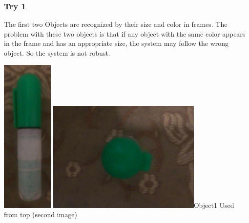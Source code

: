 \documentclass{report}
\begin{document}
\subsubsection{Try 1}
The first two Objects are recognized by their size and color in frames. The problem with these two objects is that if any object with the same color appears in the frame and has an appropriate size, the system may follow the wrong object. So the system is not robust. \newline
\begin{center}
\includegraphics[width=1in]{Object1.jpg}
\includegraphics[width=3in]{Object1-2.jpg}\newline \figurename{Object1} Used from top (second image)	
\end{center}
\end{document}
